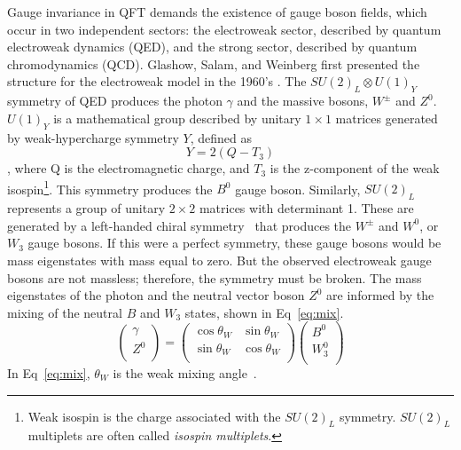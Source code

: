 Gauge invariance in QFT demands the existence of gauge boson fields, which occur in two independent sectors: the electroweak sector, described by quantum electroweak dynamics (QED), and the strong sector, described by quantum chromodynamics (QCD).  Glashow, Salam, and Weinberg first presented the structure for the electroweak model in the 1960's \cite{Glashow:1961tr, PhysRevLett.19.1264, Salam:1968rm}.  The $SU(2)_L\otimes U(1)_Y$ symmetry of QED produces the photon $\gamma$ and the massive bosons, $W^\pm$ and $Z^0$.  $U(1)_Y$ is a mathematical group described by unitary $1\times1$ matrices generated by weak-hypercharge symmetry $Y$, defined as 
\begin{equation}
Y=  2(Q-T_3)
\label{eq:Y}
\end{equation}
, where Q is the electromagnetic charge, and $T_3$ is the z-component of the weak isospin\footnote{Weak isospin is the charge associated with the $SU(2)_L$ symmetry.  $SU(2)_L$ multiplets are often called \textit{isospin multiplets}.}.   This symmetry produces the $B^0$ gauge boson.  Similarly, $SU(2)_L$ represents a group of unitary $2\times2$ matrices with determinant 1.  These are generated by a left-handed chiral symmetry~\cite{koch} that produces the $W^{\pm}$ and $W^0$, or $W_3$ gauge bosons.  If this were a perfect symmetry, these gauge bosons would be mass eigenstates with mass equal to zero. But the observed electroweak gauge bosons are not massless; therefore, the symmetry must be broken.  The mass eigenstates of the photon and the neutral vector boson $Z^0$ are informed by the mixing of the neutral $B$ and $W_3$ states, shown in Eq~\ref{eq:mix}.
\begin{equation}
\begin{pmatrix}
\gamma \\
Z^0 \\
\end{pmatrix}
=
\begin{pmatrix}
\cos\theta_W & \sin\theta_W\\
\sin\theta_W & \cos\theta_W\\
\end{pmatrix}
\begin{pmatrix}
B^0 \\
W_3^0 \\
\end{pmatrix}
\label{eq:mix}
\end{equation}
In Eq~\ref{eq:mix}, $\theta_W$ is the weak mixing angle~\cite{BILENKY198273}.  

